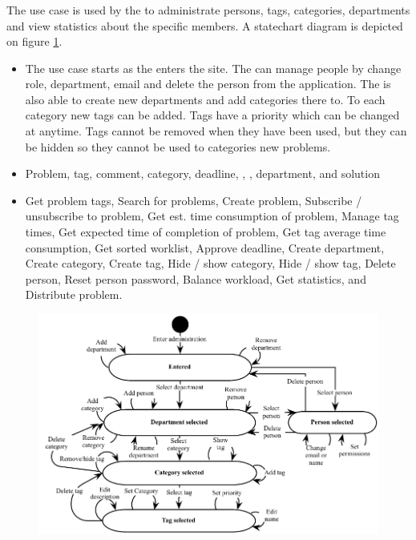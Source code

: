 \subsubsection{\tucadmin[c]} The use case \tucadmin[] is used by the \sadmin[] to administrate persons, tags, categories, departments and view statistics about the specific \astaff members. A statechart diagram is depicted on figure \ref{fig:use_case_diagram}.

\begin{itemize}
\item{} The use case starts as the \sadmin{} enters the site. The \admin[] can manage people by change role, department, email and delete the person from the application. The \admin[] is also able to create new  departments and add categories there to. To each category new tags can be added. Tags have a priority which can be changed at anytime. Tags cannot be removed when they have been used, but they can be hidden so they cannot be used to categories new problems.  

\item{} Problem, tag, comment, category, deadline, \aclient[], \astaff[], department, and solution

\item{} Get problem tags, Search for problems, Create problem, Subscribe / unsubscribe to problem, Get est. time consumption of problem, Manage tag times, Get expected time of completion of problem, Get tag average time consumption, Get sorted worklist, Approve deadline, Create department, Create category, Create tag, Hide / show category, Hide / show tag, Delete person, Reset person password, Balance workload, Get statistics, and Distribute problem. 
\end{itemize}


\begin{figure}[htbp]
\begin{center}
 \includegraphics[scale=0.8]{input/application_domain_analysis/admin_use_case}
\label{fig:use_case_diagram}
\end{center}
\end{figure}